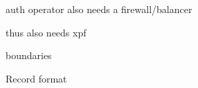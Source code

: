 \documentclass{beamer}
\begin{document}
\begin{frame}{auth operator also needs a firewall/balancer}
\end{frame}

\begin{frame}{thus also needs xpf}
\end{frame}

\begin{frame}{boundaries}
\end{frame}

\begin{frame}{Record format}
\end{frame}
\end{document}
